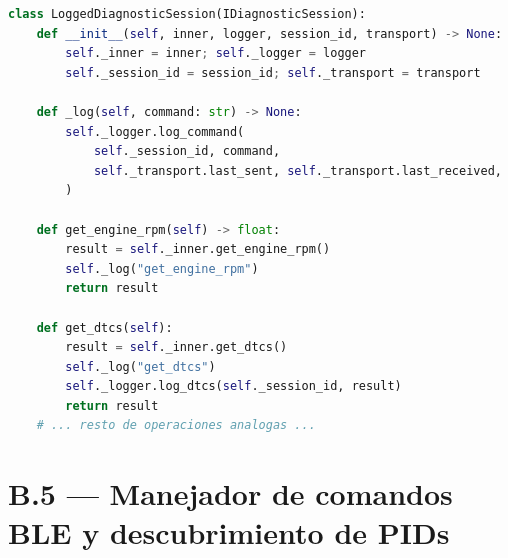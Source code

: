 \begin{lstlisting}[language=Python, caption={LoggedDiagnosticSession — persistencia del comando en SQLite}]
class LoggedDiagnosticSession(IDiagnosticSession):
    def __init__(self, inner, logger, session_id, transport) -> None:
        self._inner = inner; self._logger = logger
        self._session_id = session_id; self._transport = transport

    def _log(self, command: str) -> None:
        self._logger.log_command(
            self._session_id, command,
            self._transport.last_sent, self._transport.last_received,
        )

    def get_engine_rpm(self) -> float:
        result = self._inner.get_engine_rpm()
        self._log("get_engine_rpm")
        return result

    def get_dtcs(self):
        result = self._inner.get_dtcs()
        self._log("get_dtcs")
        self._logger.log_dtcs(self._session_id, result)
        return result
    # ... resto de operaciones analogas ...
\end{lstlisting}

\section*{B.5 — Manejador de comandos BLE y descubrimiento de PIDs}

